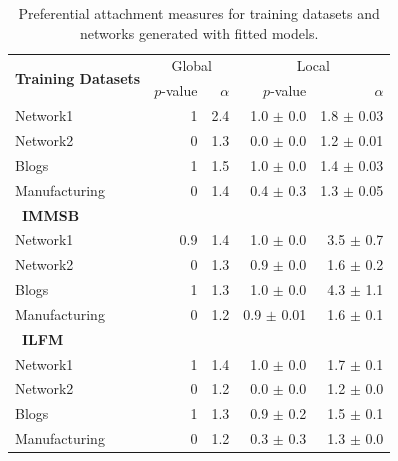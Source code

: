 \begin{table}[t]
\caption{Preferential attachment measures for training datasets and networks generated with fitted models.}
\centering
\begin{tabular}{lrrrr}
  \multirow{2}{*}{\textbf{Training Datasets}}  &
  \multicolumn{2}{c}{Global} & \multicolumn{2}{c}{Local}\\
  \cmidrule(r){2-3} \cmidrule(l){4-5}
  &   $p$-value &   $\alpha$   & $p$-value & $\alpha$   \\
\hline
Network1       & 1 & 2.4 &   1.0 $\pm$ 0.0  &  1.8 $\pm$ 0.03  \\
Network2       & 0 & 1.3 &   0.0 $\pm$ 0.0  &  1.2 $\pm$ 0.01 \\
Blogs          & 1 & 1.5 &   1.0 $\pm$ 0.0  &  1.4 $\pm$ 0.03\\
Manufacturing  & 0 & 1.4 &   0.4 $\pm$ 0.3  &  1.3 $\pm$ 0.05 \\
\hline

  \ \textbf{IMMSB} &&&& \\
\hline
Network1       & 0.9 & 1.4 &   1.0 \(\pm\) 0.0   &  3.5 \(\pm\) 0.7 \\
Network2       & 0 & 1.3 &   0.9 \(\pm\) 0.0   &  1.6 \(\pm\) 0.2 \\
Blogs          & 1 & 1.3 &   1.0 \(\pm\) 0.0   &  4.3 \(\pm\) 1.1 \\
Manufacturing  & 0 & 1.2 &   0.9 \(\pm\) 0.01  &  1.6 \(\pm\) 0.1 \\
\hline

  \ \textbf{ILFM} &&&& \\
\hline
Network1      & 1 & 1.4 &   1.0 \(\pm\) 0.0  &  1.7 \(\pm\) 0.1 \\
Network2      & 0 & 1.2 &   0.0 \(\pm\) 0.0 &  1.2 \(\pm\) 0.0 \\
Blogs         & 1 & 1.3 &   0.9 \(\pm\) 0.2  &  1.5 \(\pm\) 0.1 \\
Manufacturing & 0 & 1.2 &   0.3 \(\pm\) 0.3  &  1.3 \(\pm\) 0.0 \\
\hline
\end{tabular}
\label{table:me_gofit}
\end{table}

